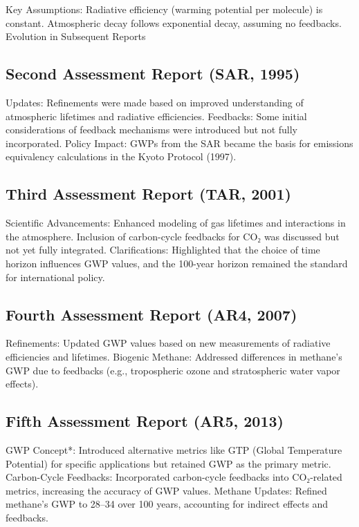 \documentclass{tufte-handout}\usepackage[]{graphicx}\usepackage[]{xcolor}
\begin{document}
Key Assumptions:
Radiative efficiency (warming potential per molecule) is constant.
Atmospheric decay follows exponential decay, assuming no feedbacks.
Evolution in Subsequent Reports


\subsection{Second Assessment Report (SAR, 1995)}

Updates: Refinements were made based on improved understanding of atmospheric lifetimes and radiative efficiencies.
Feedbacks: Some initial considerations of feedback mechanisms were introduced but not fully incorporated.
Policy Impact: GWPs from the SAR became the basis for emissions equivalency calculations in the Kyoto Protocol (1997).


\subsection{Third Assessment Report (TAR, 2001)}

Scientific Advancements:
Enhanced modeling of gas lifetimes and interactions in the atmosphere.
Inclusion of carbon-cycle feedbacks for CO₂ was discussed but not yet fully integrated.
Clarifications: Highlighted that the choice of time horizon influences GWP values, and the 100-year horizon remained the standard for international policy.


\subsection{Fourth Assessment Report (AR4, 2007)}
Refinements: Updated GWP values based on new measurements of radiative efficiencies and lifetimes.
Biogenic Methane: Addressed differences in methane’s GWP due to feedbacks (e.g., tropospheric ozone and stratospheric water vapor effects).


\subsection{Fifth Assessment Report (AR5, 2013)}
GWP Concept*: Introduced alternative metrics like GTP (Global Temperature Potential) for specific applications but retained GWP as the primary metric.
Carbon-Cycle Feedbacks: Incorporated carbon-cycle feedbacks into CO₂-related metrics, increasing the accuracy of GWP values.
Methane Updates: Refined methane’s GWP to 28–34 over 100 years, accounting for indirect effects and feedbacks.
\end{document}
